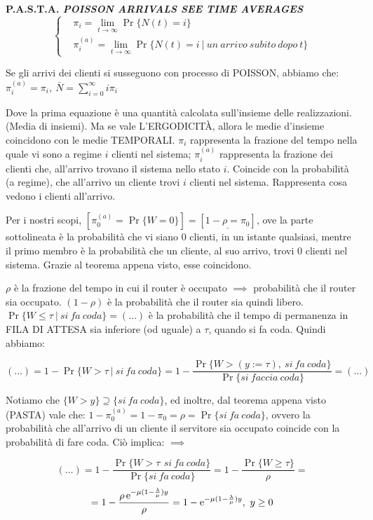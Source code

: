 \begin{itemize}
\begin{thrm}{\textbf{P.A.S.T.A. \textit{POISSON ARRIVALS SEE TIME AVERAGES}}}
\[
	\left\{
	\begin{aligned}
	&\pi_i = \lim_{t\to\infty}{\Pr\{N(t)=i\}}\\
	&\pi_i^{(a)} = \lim_{t\to\infty}{\Pr\{N(t)=i\ |\ un\ arrivo\ subito\ dopo\ t\}}
	\end{aligned}
	\right.
\]

Se gli arrivi dei clienti si susseguono con processo di POISSON, abbiamo che: $\pi_i^{(a)}=\pi_i,\ \bar{N}=\sum_{i=0}^\infty{i\pi_i}$

\end{thrm}

Dove la prima equazione è una quantità calcolata sull'insieme delle realizzazioni. (Media di insiemi). Ma se vale L'ERGODICIT\`A, allora le medie d'insieme coincidono con le medie TEMPORALI. $\pi_i$ rappresenta la frazione del tempo nella quale vi sono a regime $i$ clienti nel sistema; $\pi_i^{(a)}$ rappresenta la frazione dei clienti che, all'arrivo trovano il sistema nello stato $i$. Coincide con la probabilità (a regime), che all'arrivo un cliente trovi $i$ clienti nel sistema. Rappresenta cosa vedono i clienti all'arrivo.

Per i nostri scopi, $[\pi_0^{(a)} = \Pr\{W = 0\}] = [\underline{1-\rho = \pi_0}]$, ove la parte sottolineata è la probabilità che vi siano 0 clienti, in un istante qualsiasi, mentre il primo membro è la probabilità che un cliente, al suo arrivo, trovi 0 clienti nel sistema. Grazie al teorema appena visto, esse coincidono. 

$\rho$ è la frazione del tempo in cui il router è occupato $\implies$ probabilità che il router sia occupato. $(1-\rho)$ è la probabilità che il router sia quindi libero. 
$\Pr\{W \leq \tau\ |\ si\ fa\ coda\} = (\dots)$ è la probabilità che il tempo di permanenza in FILA DI ATTESA sia inferiore (od uguale) a $\tau$, quando si fa coda.
Quindi abbiamo:

\[
	(\dots) = 1-\Pr\{W > \tau\ |\ si\ fa\ coda\} = 1-\frac{\Pr\{W > (y := \tau),\ si\ fa\ coda\}}{\Pr\{si\ faccia\ coda\}} = (\dots)
\]

Notiamo che $\{W > y\} \supseteq \{si\ fa\ coda\}$, ed inoltre, dal teorema appena visto (PASTA) vale che: $1-\pi_0^{(a)} = 1-\pi_0 = \rho = \Pr\{si\ fa\ coda\}$, ovvero la probabilità che all'arrivo di un cliente il servitore sia occupato coincide con la probabilità di fare coda. Ciò implica: $\implies$

\[
	(\dots) = 1-\frac{\Pr\{W>\tau\,\ si\ fa\ coda\}}{\Pr\{si\ fa\ coda\}} = 1-\frac{\Pr\{W\geq\tau\}}{\rho} =
\]
\[
	= 1-\frac{\rho\mathop{}\!\mathrm{e}^{-\mu(1-\frac{\lambda}{\mu})y}}{\rho} = 1-\mathop{}\!\mathrm{e}^{-\mu(1-\frac{\lambda}{\mu})y},\ y\geq 0
\]


\end{itemize}
